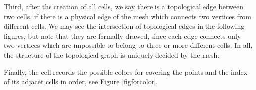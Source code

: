 \documentclass[journal]{IEEEtran}
\begin{document}
Third, after the creation of all cells, we say there is a topological edge between two cells, if there is a physical edge of the mesh which connects two vertices from different cells. 
We may see the intersection of topological edges in the following figures, but note that they are formally drawed, since each edge connects only two vertices which are impossible to belong to three or more different cells. 
In all, the structure of the topological graph is uniquely decided by the mesh. 

Finally, the cell records the possible colors for covering the points and the index of its adjacet cells in order, see Figure \ref{figforcolor}. 
\end{document}
